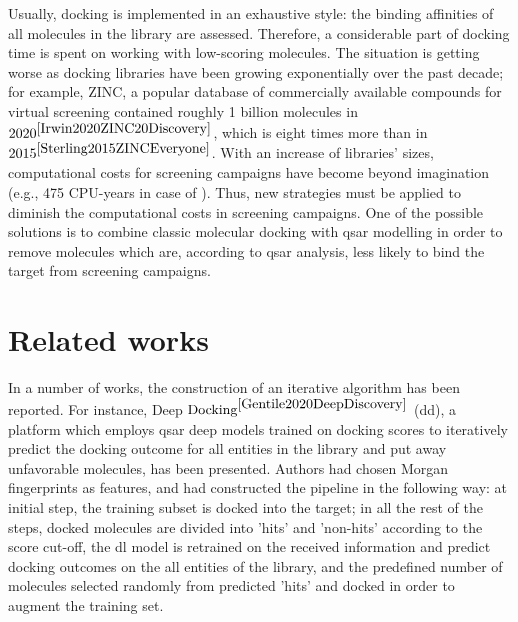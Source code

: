 Usually, docking is implemented in an exhaustive style: the binding affinities of 
all molecules in the library are assessed.
Therefore, a considerable part of docking time is spent on working with low-scoring 
molecules.
The situation is getting worse as docking libraries have been growing exponentially 
over the past decade; for example, ZINC, a popular database of commercially available 
compounds for virtual screening contained roughly 1 billion molecules in $2020^{\cite{Irwin2020ZINC20Discovery}}$, 
which is eight times more than in $2015^{\cite{Sterling2015ZINCEveryone}}$.
With an increase of libraries' sizes, computational costs for screening campaigns 
have become beyond imagination (e.g.,  475 CPU-years in case of \cite{Gorgulla2020AnScreens}).
Thus, new strategies must be applied to diminish the computational costs in screening 
campaigns.
One of the possible solutions is to combine classic molecular docking with \acrshort{qsar} 
modelling in order to remove molecules which are, according to \acrshort{qsar} analysis, 
less likely to bind the target from screening campaigns.\\

\section{Related works}
 
In a number of works, the construction of an iterative algorithm has been reported.
For instance, Deep $\text{Docking}^{\cite{Gentile2020DeepDiscovery}}$ (\acrshort{dd}), 
a platform which employs \acrshort{qsar} deep models trained on docking scores to 
iteratively predict the docking outcome for all entities in the library and put 
away unfavorable molecules, has been presented.
Authors had chosen Morgan fingerprints as features, and had constructed the pipeline 
in the following way: at initial step, the training subset is docked into the target; 
in all the rest of the steps, docked molecules are divided into 'hits' and 'non-hits' 
according to the score cut-off, the \acrshort{dl} model is retrained on the received 
information and predict docking outcomes on the all entities of the library, and 
the predefined number of molecules selected randomly from predicted 'hits' and docked 
in order to augment the training set.\\

